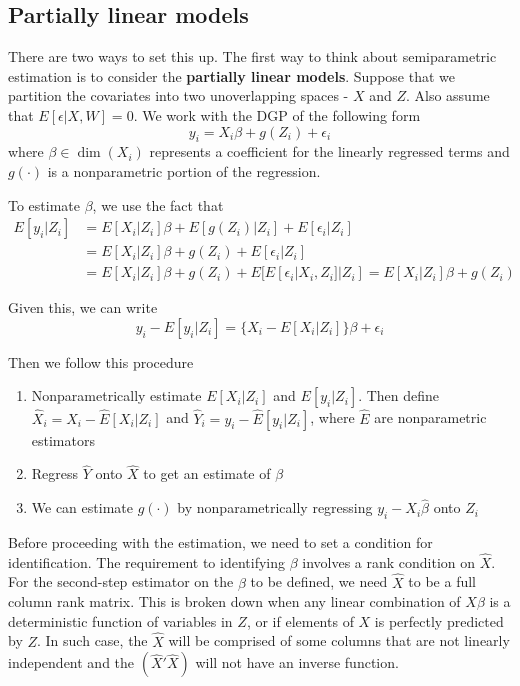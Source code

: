 \documentclass[12pt]{article}
\theoremstyle{definition}
\theoremstyle{property}
\theoremstyle{assumption}
\theoremstyle{example}
\theoremstyle{comment}
\begin{document}
\subsection{Partially linear models}
There are two ways to set this up. The first way to think about semiparametric estimation is to consider the \textbf{partially linear models}.  Suppose that we partition the covariates into two unoverlapping spaces - $X$ and $Z$. Also assume that $E[\epsilon|X,W]=0$. We work with the DGP of the following form
\[
y_i = X_i\beta + g(Z_i)+\epsilon_i 
\]
where $\beta\in\dim{(X_i)} $ represents a coefficient for the linearly regressed terms and $g(\cdot)$ is a nonparametric portion of the regression.  \par
To estimate $\beta$, we use the fact that
\begin{align*}
E[y_i|Z_i]&=E[X_i|Z_i]\beta + E[g(Z_i)|Z_i]+E[\epsilon_i|Z_i]\\
&=E[X_i|Z_i]\beta + g(Z_i)+E[\epsilon_i|Z_i]\\
&=E[X_i|Z_i]\beta + g(Z_i)+E[E[\epsilon_i|X_i,Z_i]|Z_i] = E[X_i|Z_i]\beta +g(Z_i)
\end{align*}\par
Given this, we can write
\[
y_i-E[y_i|Z_i]=\{X_i-E[X_i|Z_i]\}\beta +\epsilon_i
\]\par
Then we follow this procedure
\begin{enumerate}
\item Nonparametrically estimate $E[X_i|Z_i]$ and $E[y_i|Z_i]$. Then define $\widehat{X}_i=X_i-\widehat{E}[X_i|Z_i]$ and $\widehat{Y}_i = y_i-\widehat{E}[y_i|Z_i]$, where $\widehat{E}$ are nonparametric estimators
\item Regress $\widehat{Y}$ onto $\widehat{X}$ to get an estimate of $\beta$
\item We can estimate $g(\cdot)$ by nonparametrically regressing $y_i-X_i\hat{\beta}$ onto $Z_i$
\end{enumerate}
\par
Before proceeding with the estimation, we need to set a condition for identification. The requirement to identifying $\beta$ involves a rank condition on $\widehat{X}$. For the second-step estimator on the $\beta$ to be defined, we need $\widehat{X}$ to be a full column rank matrix. This is broken down when any linear combination of $X\beta$ is a deterministic function of variables in $Z$, or if elements of $X$ is perfectly predicted by $Z$. In such case, the $\widehat{X}$ will be comprised of some columns that are not linearly independent and the $(\widehat{X}'\widehat{X})$ will not have an inverse function.  
\end{document}
